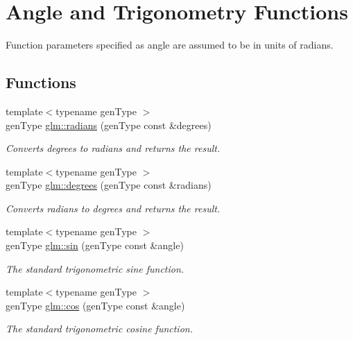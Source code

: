\hypertarget{group__core__func__trigonometric}{\section{Angle and Trigonometry Functions}
\label{group__core__func__trigonometric}
}


Function parameters specified as angle are assumed to be in units of radians.  


\subsection*{Functions}
\begin{DoxyCompactItemize}
\item 
{\footnotesize template$<$typename gen\-Type $>$ }\\gen\-Type \hyperlink{group__core__func__trigonometric_ga4fb76e28851c9ff6653532566084e091}{glm\-::radians} (gen\-Type const \&degrees)
\begin{DoxyCompactList}\small\item\em Converts degrees to radians and returns the result. \end{DoxyCompactList}\item 
{\footnotesize template$<$typename gen\-Type $>$ }\\gen\-Type \hyperlink{group__core__func__trigonometric_ga034bdb53d458242c506e4d830c7df3aa}{glm\-::degrees} (gen\-Type const \&radians)
\begin{DoxyCompactList}\small\item\em Converts radians to degrees and returns the result. \end{DoxyCompactList}\item 
{\footnotesize template$<$typename gen\-Type $>$ }\\gen\-Type \hyperlink{group__core__func__trigonometric_ga4fcd05daafb008f20e121e727c0196c7}{glm\-::sin} (gen\-Type const \&angle)
\begin{DoxyCompactList}\small\item\em The standard trigonometric sine function. \end{DoxyCompactList}\item 
{\footnotesize template$<$typename gen\-Type $>$ }\\gen\-Type \hyperlink{group__core__func__trigonometric_gace62d5d164def52455aeff19e1bccd88}{glm\-::cos} (gen\-Type const \&angle)
\begin{DoxyCompactList}\small\item\em The standard trigonometric cosine function. \end{DoxyCompactList}\item 

\end{DoxyCompactItemize}
